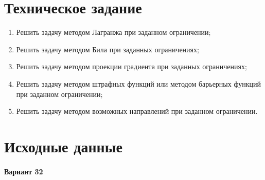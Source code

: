 





\tableofcontents
\listoffigures
\newpage

\section{Техническое задание}

\begin{enumerate}
	\setlength{\itemsep}{0em}
	\item Решить задачу методом Лагранжа при заданном ограничении;
	\item Решить задачу методом Била при заданных ограничениях;
	\item Решить задачу методом проекции градиента при заданных ограничениях;
	\item Решить задачу методом штрафных функций или методом барьерных функций при
заданном ограничении;
	\item Решить задачу методом возможных направлений при заданном ограничении.
\end{enumerate}

\section{Исходные данные}

\paragraph{Вариант 32}

